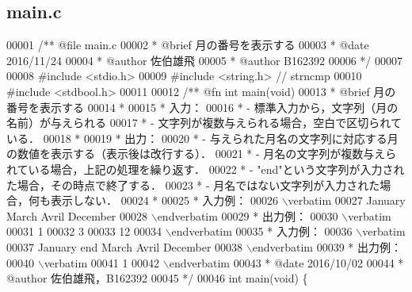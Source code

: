 \subsection{main.\-c}

\begin{DoxyCode}
00001 \textcolor{comment}{/**  @file main.c}
00002 \textcolor{comment}{ *   @brief  月の番号を表示する}
00003 \textcolor{comment}{ *   @date   2016/11/24}
00004 \textcolor{comment}{ *   @author 佐伯雄飛}
00005 \textcolor{comment}{ *   @author B162392}
00006 \textcolor{comment}{ */}
00007 
00008 \textcolor{preprocessor}{#include <stdio.h>}
00009 \textcolor{preprocessor}{#include <string.h>}  \textcolor{comment}{// strncmp}
00010 \textcolor{preprocessor}{#include <stdbool.h>}
00011 \textcolor{comment}{}
00012 \textcolor{comment}{/** @fn int main(void)}
00013 \textcolor{comment}{ *  @brief 月の番号を表示する}
00014 \textcolor{comment}{ *}
00015 \textcolor{comment}{ *  入力：}
00016 \textcolor{comment}{ *  - 標準入力から，文字列（月の名前）が与えられる}
00017 \textcolor{comment}{ *  - 文字列が複数与えられる場合，空白で区切られている．}
00018 \textcolor{comment}{ *}
00019 \textcolor{comment}{ *  出力：}
00020 \textcolor{comment}{ *  - 与えられた月名の文字列に対応する月の数値を表示する（表示後は改行する）．}
00021 \textcolor{comment}{ *  - 月名の文字列が複数与えられている場合，上記の処理を繰り返す．}
00022 \textcolor{comment}{ *  - "end"という文字列が入力された場合，その時点で終了する．}
00023 \textcolor{comment}{ *  - 月名ではない文字列が入力された場合，何も表示しない．}
00024 \textcolor{comment}{ *}
00025 \textcolor{comment}{ *  入力例：}
00026 \textcolor{comment}{\(\backslash\)verbatim}
00027 \textcolor{comment}{January March Avril December}
00028 \textcolor{comment}{\(\backslash\)endverbatim}
00029 \textcolor{comment}{  *  出力例：}
00030 \textcolor{comment}{\(\backslash\)verbatim}
00031 \textcolor{comment}{1}
00032 \textcolor{comment}{3}
00033 \textcolor{comment}{12}
00034 \textcolor{comment}{\(\backslash\)endverbatim}
00035 \textcolor{comment}{  *  入力例：}
00036 \textcolor{comment}{\(\backslash\)verbatim}
00037 \textcolor{comment}{January end March Avril December}
00038 \textcolor{comment}{\(\backslash\)endverbatim}
00039 \textcolor{comment}{  *  出力例：}
00040 \textcolor{comment}{\(\backslash\)verbatim}
00041 \textcolor{comment}{1}
00042 \textcolor{comment}{\(\backslash\)endverbatim}
00043 \textcolor{comment}{ *  @date   2016/10/02}
00044 \textcolor{comment}{ *  @author 佐伯雄飛，B162392}
00045 \textcolor{comment}{ */}
00046 \textcolor{keywordtype}{int} main(\textcolor{keywordtype}{void}) \{

\end{DoxyCode}
